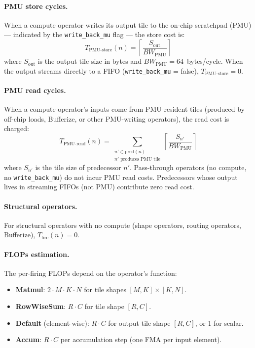 \documentclass[10pt]{article}
\begin{document}
\paragraph{PMU store cycles.} When a compute operator writes its output tile to the on-chip scratchpad (PMU) --- indicated by the \texttt{write\_back\_mu} flag --- the store cost is:
\begin{equation}
    T_{\text{PMU-store}}(n) = \left\lceil\frac{S_{\text{out}}}{\mathit{BW}_{\text{PMU}}}\right\rceil
\end{equation}
where $S_{\text{out}}$ is the output tile size in bytes and $\mathit{BW}_{\text{PMU}} = 64$~bytes/cycle. When the output streams directly to a FIFO (\texttt{write\_back\_mu} = false), $T_{\text{PMU-store}} = 0$.

\paragraph{PMU read cycles.} When a compute operator's inputs come from PMU-resident tiles (produced by off-chip loads, Bufferize, or other PMU-writing operators), the read cost is charged:
\begin{equation}
    T_{\text{PMU-read}}(n) = \sum_{\substack{n' \in \text{pred}(n) \\ n' \text{ produces PMU tile}}} \left\lceil\frac{S_{n'}}{\mathit{BW}_{\text{PMU}}}\right\rceil
\end{equation}
where $S_{n'}$ is the tile size of predecessor $n'$. Pass-through operators (no compute, no \texttt{write\_back\_mu}) do not incur PMU read costs. Predecessors whose output lives in streaming FIFOs (not PMU) contribute zero read cost.

\paragraph{Structural operators.} For structural operators with no compute (shape operators, routing operators, Bufferize), $T_{\text{fire}}(n) = 0$.

\paragraph{FLOPs estimation.} The per-firing FLOPs depend on the operator's function:
\begin{itemize}[nosep]
    \item \textbf{Matmul}: $2 \cdot M \cdot K \cdot N$ for tile shapes $[M, K] \times [K, N]$.
    \item \textbf{RowWiseSum}: $R \cdot C$ for tile shape $[R, C]$.
    \item \textbf{Default} (element-wise): $R \cdot C$ for output tile shape $[R, C]$, or 1 for scalar.
    \item \textbf{Accum}: $R \cdot C$ per accumulation step (one FMA per input element).
\end{itemize}
\end{document}
